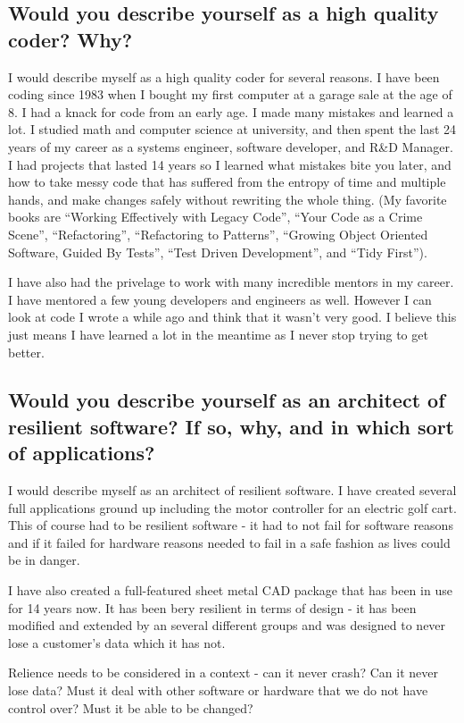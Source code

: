 \documentclass[letter,12pt]{article}
\begin{document}
\subsection{Would you describe yourself as a high quality coder? Why?}
I would describe myself as a high quality coder for several reasons. I have been coding since 1983 when I bought my first computer at a garage sale at the age of 8. I had a knack for code from an early age. I made many mistakes and learned a lot. I studied math and computer science at university, and then spent the last 24 years of my career as a systems engineer, software developer, and R\&D Manager. I had projects that lasted 14 years so I learned what mistakes bite you later, and how to take messy code that has suffered from the entropy of time and multiple hands, and make changes safely without rewriting the whole thing. (My favorite books are ``Working Effectively with Legacy Code'', ``Your Code as a Crime Scene'', ``Refactoring'', ``Refactoring to Patterns'', ``Growing Object Oriented Software, Guided By Tests'', ``Test Driven Development'', and ``Tidy First'').

I have also had the privelage to work with many incredible mentors in my career. I have mentored a few young developers and engineers as well. However I can look at code I wrote a while ago and think that it wasn't very good. I believe this just means I have learned a lot in the meantime as I never stop trying to get better.

\subsection{Would you describe yourself as an architect of resilient software? If so, why, and in which sort of applications?}
I would describe myself as an architect of resilient software. I have created several full applications ground up including the motor controller for an electric golf cart. This of course had to be resilient software - it had to not fail for software reasons and if it failed for hardware reasons needed to fail in a safe fashion as lives could be in danger.

I have also created a full-featured sheet metal CAD package that has been in use for 14 years now. It has been bery resilient in terms of design - it has been modified and extended by an several different groups and was designed to never lose a customer's data which it has not.

Relience needs to be considered in a context - can it never crash? Can it never lose data? Must it deal with other software or hardware that we do not have control over? Must it be able to be changed?
\end{document}
